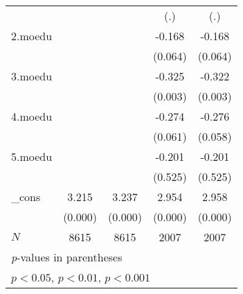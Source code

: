{\begin{tabular}{l*{4}{c}}
            &                     &                     &         (.)         &         (.)         \\
[1em]
2.moedu     &                     &                     &      -0.168         &      -0.168         \\
            &                     &                     &     (0.064)         &     (0.064)         \\
[1em]
3.moedu     &                     &                     &      -0.325\sym{**} &      -0.322\sym{**} \\
            &                     &                     &     (0.003)         &     (0.003)         \\
[1em]
4.moedu     &                     &                     &      -0.274         &      -0.276         \\
            &                     &                     &     (0.061)         &     (0.058)         \\
[1em]
5.moedu     &                     &                     &      -0.201         &      -0.201         \\
            &                     &                     &     (0.525)         &     (0.525)         \\
[1em]
\_cons      &       3.215\sym{***}&       3.237\sym{***}&       2.954\sym{***}&       2.958\sym{***}\\
            &     (0.000)         &     (0.000)         &     (0.000)         &     (0.000)         \\
\hline
\(N\)       &        8615         &        8615         &        2007         &        2007         \\
\hline\hline
\multicolumn{5}{l}{\footnotesize \textit{p}-values in parentheses}\\
\multicolumn{5}{l}{\footnotesize \sym{*} \(p<0.05\), \sym{**} \(p<0.01\), \sym{***} \(p<0.001\)}\\
\end{tabular}
}
